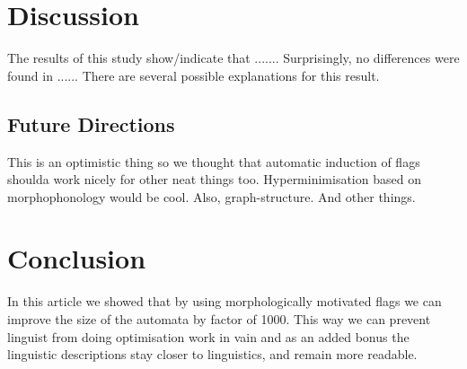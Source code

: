 \documentclass[11pt]{article}
\begin{document}
\section{Discussion}
\label{sec:discussion}

The results of this study show/indicate that .......
Surprisingly, no differences were found in ......
There are several possible explanations for this result.

\subsection{Future Directions}
\label{subsec:future-directions}

This is an optimistic thing so we thought that automatic induction of flags
shoulda work nicely for other neat things too. Hyperminimisation based on
morphophonology would be cool. Also, graph-structure. And other things.

\section{Conclusion}
\label{sec:conclusion}

In this article we showed that by using morphologically motivated flags we can
improve the size of the automata by factor of 1000. This way we can prevent
linguist from doing optimisation work in vain and as an added bonus the
linguistic descriptions stay closer to linguistics, and remain more readable.

\end{document}
